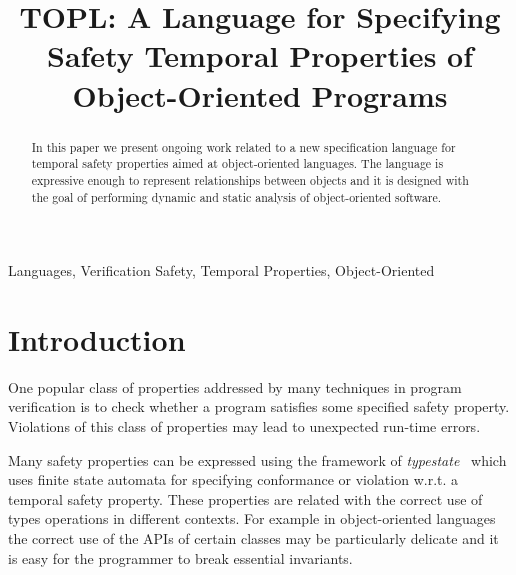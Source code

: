 \documentclass[preprint]{sigplanconf} %
\title{TOPL: A Language for Specifying Safety Temporal Properties of Object-Oriented Programs}
\theoremstyle{definition}
\theoremstyle{remark}
\begin{document}
\maketitle

\begin{abstract} %
In this paper we present ongoing work related to a new specification language for temporal safety properties aimed at object-oriented languages.
The language is expressive enough to represent relationships between objects and it is designed with the goal of performing dynamic and static analysis of object-oriented software.
\end{abstract}
\terms Languages, Verification
\keywords Safety, Temporal Properties, Object-Oriented

\section{Introduction} %
One popular class of properties addressed by many techniques in program verification is to check whether a program satisfies some specified safety property.  
Violations of this class of properties may lead to unexpected run-time errors.

Many safety properties can be expressed using the framework of {\em typestate}~\cite{strom1986} which uses finite state automata for specifying conformance or violation w.r.t. a temporal safety property.
These properties are related with the correct use of types operations in different contexts. 
For example in object-oriented languages the correct use of the APIs of certain classes may be particularly delicate and it is easy for the programmer to break essential invariants.
\end{document}
